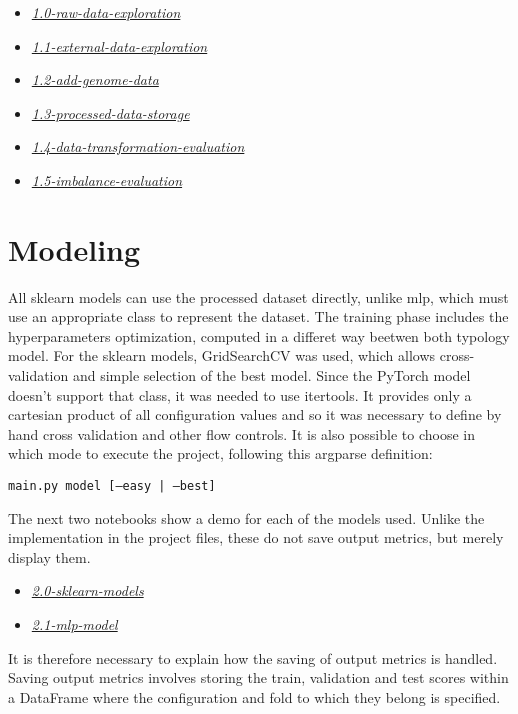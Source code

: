 \documentclass[../main]{subfiles}
\begin{document}
\begin{itemize}
    \item \href{https://github.com/prushh/movie-lens-mlp/blob/main/notebooks/1.0-raw-data-exploration.ipynb}{\textit{1.0-raw-data-exploration}}
    \item \href{https://github.com/prushh/movie-lens-mlp/blob/main/notebooks/1.1-external-data-exploration.ipynb}{\textit{1.1-external-data-exploration}}
    \item \href{https://github.com/prushh/movie-lens-mlp/blob/main/notebooks/1.2-add-genome-data.ipynb}{\textit{1.2-add-genome-data}}
    \item \href{https://github.com/prushh/movie-lens-mlp/blob/main/notebooks/1.3-processed-data-storage.ipynb}{\textit{1.3-processed-data-storage}}
    \item \href{https://github.com/prushh/movie-lens-mlp/blob/main/notebooks/1.4-data-transformation-evaluation.ipynb}{\textit{1.4-data-transformation-evaluation}}
    \item \href{https://github.com/prushh/movie-lens-mlp/blob/main/notebooks/1.5-imbalance-evaluation.ipynb}{\textit{1.5-imbalance-evaluation}}
\end{itemize}

\section{Modeling}
All sklearn models can use the processed dataset directly, unlike mlp, which must use an appropriate class to represent the dataset.
The training phase includes the hyperparameters optimization, computed in a differet way beetwen both typology model.
For the sklearn models, GridSearchCV was used, which allows cross-validation and simple selection of the best model.
Since the PyTorch model doesn't support that class, it was needed to use itertools.
It provides only a cartesian product of all configuration values and so it was necessary to define by hand cross validation and other flow controls.
It is also possible to choose in which mode to execute the project, following this argparse definition:
\begin{center}
    \texttt{main.py model [--easy | --best]}
\end{center}

The next two notebooks show a demo for each of the models used.
Unlike the implementation in the project files, these do not save output metrics, but merely display them.
\begin{itemize}
    \item \href{https://github.com/prushh/movie-lens-mlp/blob/main/notebooks/2.0-sklearn-models.ipynb}{\textit{2.0-sklearn-models}}
    \item \href{https://github.com/prushh/movie-lens-mlp/blob/main/notebooks/2.1-mlp-model.ipynb}{\textit{2.1-mlp-model}}
\end{itemize}
It is therefore necessary to explain how the saving of output metrics is handled.
Saving output metrics involves storing the train, validation and test scores within a DataFrame where the configuration and fold to which they belong is specified.
\end{document}
